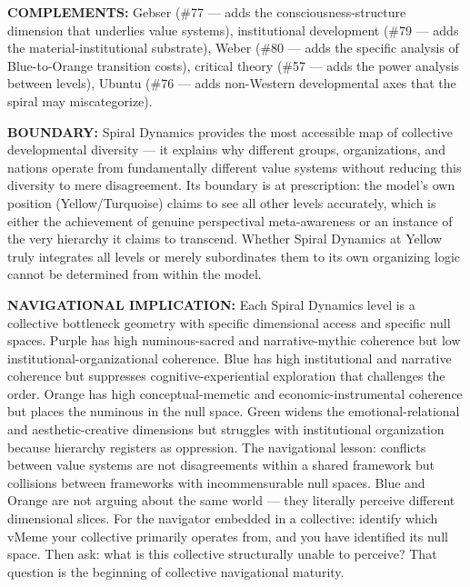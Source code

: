 \textbf{COMPLEMENTS:} Gebser (\#77 — adds the consciousness-structure dimension that underlies value systems), institutional development (\#79 — adds the material-institutional substrate), Weber (\#80 — adds the specific analysis of Blue-to-Orange transition costs), critical theory (\#57 — adds the power analysis between levels), Ubuntu (\#76 — adds non-Western developmental axes that the spiral may miscategorize).


\textbf{BOUNDARY:} Spiral Dynamics provides the most accessible map of collective developmental diversity — it explains why different groups, organizations, and nations operate from fundamentally different value systems without reducing this diversity to mere disagreement. Its boundary is at prescription: the model's own position (Yellow/\allowbreak Turquoise) claims to see all other levels accurately, which is either the achievement of genuine perspectival meta-awareness or an instance of the very hierarchy it claims to transcend. Whether Spiral Dynamics at Yellow truly integrates all levels or merely subordinates them to its own organizing logic cannot be determined from within the model.


\textbf{NAVIGATIONAL IMPLICATION:} Each Spiral Dynamics level is a collective bottleneck geometry with specific dimensional access and specific null spaces. Purple has high numinous-sacred and narrative-mythic coherence but low institutional-organizational coherence. Blue has high institutional and narrative coherence but suppresses cognitive-experiential exploration that challenges the order. Orange has high conceptual-memetic and economic-instrumental coherence but places the numinous in the null space. Green widens the emotional-relational and aesthetic-creative dimensions but struggles with institutional organization because hierarchy registers as oppression. The navigational lesson: conflicts between value systems are not disagreements within a shared framework but collisions between frameworks with incommensurable null spaces. Blue and Orange are not arguing about the same world — they literally perceive different dimensional slices. For the navigator embedded in a collective: identify which vMeme your collective primarily operates from, and you have identified its null space. Then ask: what is this collective structurally unable to perceive? That question is the beginning of collective navigational maturity.


\bigskip\noindent\makebox[\textwidth]{\color{rulegray}\rule{5cm}{0.3pt}}\bigskip


